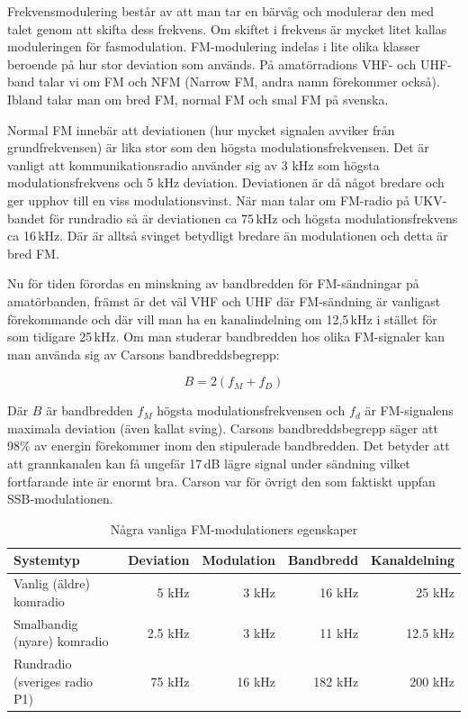 Frekvensmodulering består av att man tar en bärvåg och modulerar den med talet
genom att skifta dess frekvens. Om skiftet i frekvens är mycket litet kallas
moduleringen för fasmodulation. FM-modulering indelas i lite olika klasser
beroende på hur stor deviation som används. På amatörradions VHF- och UHF-band
talar vi om FM och NFM (Narrow FM, andra namn förekommer också). Ibland talar
man om bred FM, normal FM och smal FM på svenska.

Normal FM innebär att deviationen (hur mycket signalen avviker från
grundfrekvensen) är lika stor som den högsta modulationsfrekvensen. Det är
vanligt att kommunikationsradio använder sig av 3 kHz som högsta
modulationsfrekvens och 5 kHz deviation. Deviationen är då något bredare och ger
upphov till en viss modulationsvinst. När man talar om FM-radio på UKV-bandet
för rundradio så är deviationen ca 75\,kHz och högsta modulationsfrekvens ca
16\,kHz. Där är alltså svinget betydligt bredare än modulationen och detta är
bred FM.

Nu för tiden förordas en minskning av bandbredden för FM-sändningar på
amatörbanden, främst är det väl VHF och UHF där FM-sändning är vanligast
förekommande och där vill man ha en kanalindelning om 12,5\,kHz i stället för
som tidigare 25\,kHz. Om man studerar bandbredden hos olika FM-signaler kan
man använda sig av Carsons bandbreddsbegrepp:

\begin{equation}
	B=2(f_M+f_D)
\end{equation}

Där $B$ är bandbredden $f_M$ högsta modulationsfrekvensen och $f_d$ är
FM-signalens maximala deviation (även kallat sving). Carsons bandbreddsbegrepp
säger att 98\% av energin förekommer inom den stipulerade bandbredden. Det
betyder att att grannkanalen kan få ungefär 17\,dB lägre signal under sändning
vilket fortfarande inte är enormt bra. Carson var för övrigt den som faktiskt
uppfan SSB-modulationen.

\begin{table}[H]
  \centering
  \begin{tabular}{lrrrr}
    \bf Systemtyp             & \bf Deviation & \bf Modulation & \bf Bandbredd & \bf Kanaldelning \\ \hline
Vanlig (äldre) komradio       & 5 kHz         & 3 kHz          & 16 kHz        & 25 kHz           \\
Smalbandig (nyare) komradio   & 2.5 kHz       & 3 kHz          & 11 kHz        & 12.5 kHz         \\
Rundradio (sveriges radio P1) & 75 kHz        & 16 kHz         & 182 kHz       & 200 kHz          \\
  \end{tabular}
  \caption{Några vanliga FM-modulationers egenskaper}
\end{table}

